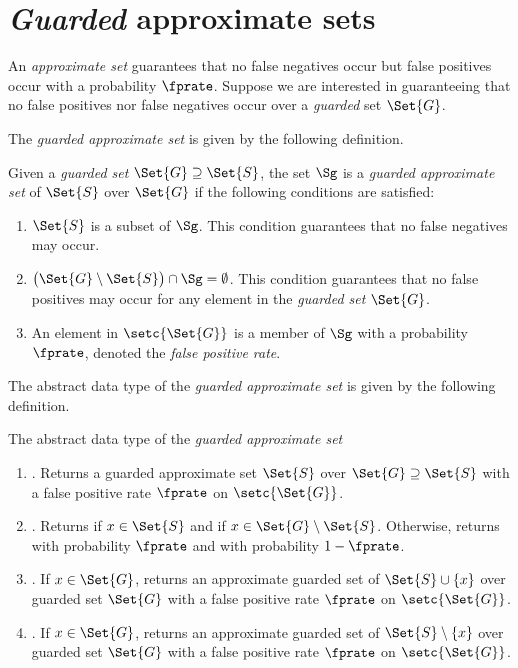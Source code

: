 \documentclass[ ../main.tex]{subfiles}
\begin{document}
\section{\emph{Guarded} approximate sets}
\label{sec:guarded}
An \emph{approximate set}\cite{oph} guarantees that no false negatives occur but false positives occur with a probability $\fprate$. Suppose we are interested in guaranteeing that no false positives nor false negatives occur over a \emph{guarded} set $\Set{G}$.

The \emph{guarded approximate set} is given by the following definition.
\begin{definition}
Given a \emph{guarded set} $\Set{G} \supseteq \Set{S}$, the set $\Sg$ is a \emph{guarded approximate set} of $\Set{S}$ over $\Set{G}$ if the following conditions are satisfied:
\begin{enumerate}
    \item $\Set{S}$ is a subset of $\Sg$. This condition guarantees that no false negatives may occur.
    \item $\left(\Set{G} \setminus \Set{S}\right) \cap \Sg = \emptyset$. This condition guarantees that no false positives may occur for any element in the \emph{guarded set} $\Set{G}$.
    \item An element in $\setc{\Set{G}}$ is a member of $\Sg$ with a probability $\fprate$, denoted the \emph{false positive rate}.
\end{enumerate}
\end{definition}

The abstract data type of the \emph{guarded approximate set} is given by the following definition.
\begin{definition}
The abstract data type of the \emph{guarded approximate set}
\begin{enumerate}
    \item {}. Returns a guarded approximate set $\Set{S}$ over $\Set{G} \supseteq \Set{S}$ with a false positive rate $\fprate$ on $\setc{\Set{G}}$.
    \item {}. Returns \True if $x \in \Set{S}$ and \False if $x \in \Set{G} \setminus \Set{S}$. Otherwise, returns \True with probability $\fprate$ and \False with probability $1 - \fprate$.
    \item {}. If $x \in \Set{G}$, returns an approximate guarded set of $\Set{S} \cup \{x\}$ over guarded set $\Set{G}$ with a false positive rate $\fprate$ on $\setc{\Set{G}}$.
    \item {}. If $x \in \Set{G}$, returns an approximate guarded set of $\Set{S} \setminus \{x\}$ over guarded set $\Set{G}$ with a false positive rate $\fprate$ on $\setc{\Set{G}}$.
\end{enumerate}
\end{definition}
\end{document}
